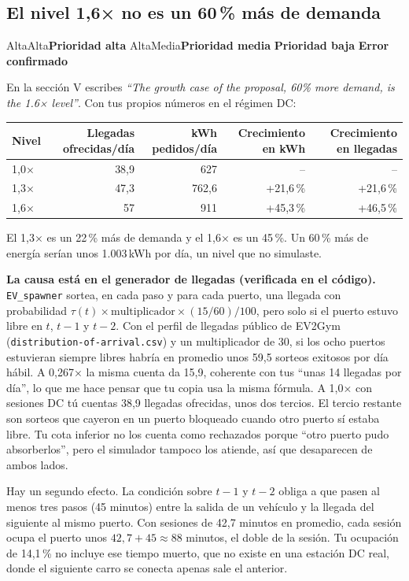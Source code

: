 \documentclass[11pt]{article}
\newcommand{\prioridad}[1]{%
  \def\tmpA{Alta}\def\tmpM{Media}\def\tmp{#1}%
  \ifx\tmp\tmpA\colorbox{rojoerror}{\color{white}\small\bfseries Prioridad alta}%
  \else\ifx\tmp\tmpM\colorbox{naranjatarea}{\color{white}\small\bfseries Prioridad media}%
  \else\colorbox{azulidea}{\color{white}\small\bfseries Prioridad baja}\fi\fi}
\newcommand{\confirmado}{\colorbox{rojoerror!15}{\small\bfseries\color{rojoerror} Error confirmado}}
\begin{document}
\subsection{\texorpdfstring{El nivel 1,6× no es un 60\,\% más de demanda}{El nivel 1,6x no es un 60 por ciento más de demanda}}
\prioridad{Alta} \confirmado

\begin{error}
En la sección V escribes \foreignlanguage{english}{\emph{``The growth case of the proposal, 60\% more demand, is the 1.6× level''}}. Con tus propios números en el régimen DC:
\begin{center}
\small
\begin{tabular}{@{}lrrrr@{}}
\toprule
Nivel & Llegadas ofrecidas/día & kWh pedidos/día & Crecimiento en kWh & Crecimiento en llegadas \\
\midrule
1,0× & 38,9 & 627 & -- & -- \\
1,3× & 47,3 & 762,6 & +21,6\,\% & +21,6\,\% \\
1,6× & 57 & 911 & +45,3\,\% & +46,5\,\% \\
\bottomrule
\end{tabular}
\end{center}
El 1,3× es un 22\,\% más de demanda y el 1,6× es un 45\,\%. Un 60\,\% más de energía serían unos 1.003\,kWh por día, un nivel que no simulaste.
\end{error}

\textbf{La causa está en el generador de llegadas (verificada en el código).} \texttt{EV\_spawner} sortea, en cada paso y para cada puerto, una llegada con probabilidad $\tau(t) \times \text{multiplicador} \times (15/60)/100$, pero solo si el puerto estuvo libre en $t$, $t-1$ y $t-2$. Con el perfil de llegadas público de EV2Gym (\texttt{distribution-of-arrival.csv}) y un multiplicador de 30, si los ocho puertos estuvieran siempre libres habría en promedio unos 59,5 sorteos exitosos por día hábil. A 0,267× la misma cuenta da 15,9, coherente con tus ``unas 14 llegadas por día'', lo que me hace pensar que tu copia usa la misma fórmula. A 1,0× con sesiones DC tú cuentas 38,9 llegadas ofrecidas, unos dos tercios. El tercio restante son sorteos que cayeron en un puerto bloqueado cuando otro puerto sí estaba libre. Tu cota inferior no los cuenta como rechazados porque ``otro puerto pudo absorberlos'', pero el simulador tampoco los atiende, así que desaparecen de ambos lados.

Hay un segundo efecto. La condición sobre $t-1$ y $t-2$ obliga a que pasen al menos tres pasos (45 minutos) entre la salida de un vehículo y la llegada del siguiente al mismo puerto. Con sesiones de 42,7 minutos en promedio, cada sesión ocupa el puerto unos $42{,}7 + 45 \approx 88$ minutos, el doble de la sesión. Tu ocupación de 14,1\,\% no incluye ese tiempo muerto, que no existe en una estación DC real, donde el siguiente carro se conecta apenas sale el anterior.
\end{document}
